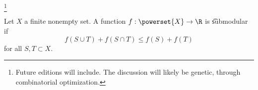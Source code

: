 
\footnote{Future editions will include. The discussion will likely be genetic, through combinatorial optimization.}


Let $X$ a finite nonempty set.
A function $f: \powerset{X} \to \R$ is \t{submodular} if
\[
  f(S \cup T) + f(S \cap T) \leq f(S) + f(T)
\]
for all $S, T \subset X$.

\blankpage
